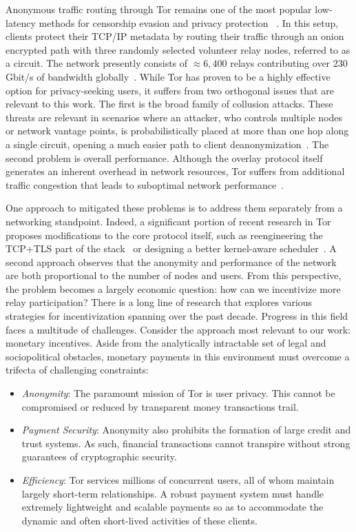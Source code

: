 Anonymous traffic routing through Tor remains one of the most popular
low-latency methods for censorship evasion and privacy protection
~\cite{dingledine2004tor}. In this setup, clients protect their TCP/IP metadata
by routing their traffic through an onion encrypted path with three
randomly selected volunteer relay nodes, referred to as a circuit. The network
presently consists of $\approx 6,400$ relays contributing over 230 Gbit/s of
bandwidth globally~\cite{portal2018tormetrics}. While Tor has proven to be a
highly effective option for privacy-seeking users, it suffers from two
orthogonal issues that are relevant to this work. The first is the broad family
of collusion attacks. These threats are relevant in scenarios where an attacker,
who controls multiple nodes or network vantage points, is probabilistically placed at more than one hop
along a single circuit, opening a much easier path to client
deanonymization~\cite{wright2004predecessor,murdoch2005low}. The second
problem is overall performance. Although the overlay protocol itself generates
an inherent overhead in network resources, Tor suffers from additional traffic
congestion that leads to suboptimal network
performance~\cite{portal2018tormetrics, alsabah2016performance}.

One approach to mitigated these problems is to address them separately from a
networking standpoint. Indeed, a significant portion of recent research in Tor
proposes modifications to the core protocol itself, such as reengineering the
TCP+TLS part of the stack~\cite{reardon2009improving} or designing a better
kernel-aware scheduler~\cite{jansen2014never}. A second approach observes that
the anonymity and performance of the network are both proportional to the number
of nodes and users. From this perspective, the problem becomes a largely
economic question: how can we incentivize more relay participation? There is a
long line of research that explores various strategies for incentivization
spanning over the past decade. Progress in this field faces a multitude of
challenges. Consider the approach most relevant to our work: monetary
incentives. Aside from the analytically intractable set of legal and
sociopolitical obstacles, monetary payments in this environment must overcome a
trifecta of challenging constraints:

\begin{itemize}
\item \emph{Anonymity}: The paramount mission of Tor is user privacy. This
  cannot be compromised or reduced by transparent money transactions trail.
\item \emph{Payment Security}: Anonymity also prohibits the formation of large
  credit and trust systems. As such, financial transactions cannot transpire
  without strong guarantees of cryptographic security.
\item \emph{Efficiency}: Tor services millions of concurrent users, all of whom
  maintain largely short-term relationships. A robust payment system must handle
  extremely lightweight and scalable payments so as to accommodate the dynamic
  and often short-lived activities of these clients.
\end{itemize}


